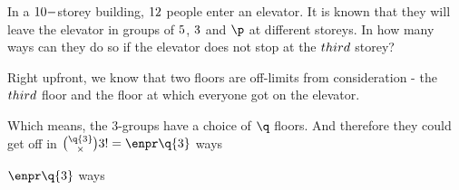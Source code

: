 

\EXPR[0]\p{(\vb - (\vc + \vd))}
\SUBTRACT{}\q

\question[3] In a $10-$storey building, $12$ people enter an elevator. 
It is known that they will leave the elevator in groups of 
$5$, $3$ and $\p$ at different storeys. In how many ways can they do 
so if the elevator does not stop at the $third$ storey?

\watchout[-1cm]

\begin{solution}[\mcq]
  Right upfront, we know that two floors are off-limits from consideration - the $third$ floor
  and the floor at which everyone got on the elevator. 

  Which means, the 3-groups have a choice of $\q$ floors. And therefore they could get off 
  in $\binom\q{3}\times 3! = \enpr\q{3}$ ways
\end{solution}

\ifprintanswers\begin{codex}$\enpr\q{3}$ ways\end{codex}\fi
